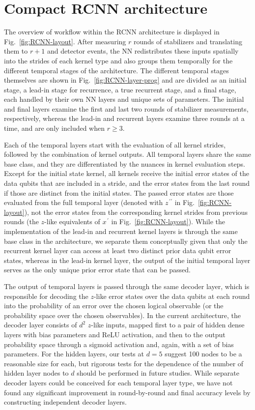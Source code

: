 \section{Compact RCNN architecture}
\label{sec:rcnn}

The overview of workflow within the RCNN architecture is displayed in Fig.~\ref{fig:RCNN-layout}. After measuring $r$ rounds of stabilizers and translating them to $r+1$  and  detector events, the NN redistributes these inputs spatially into the strides of each kernel type and also groups them temporally for the different temporal stages of the architecture. The different temporal stages themselves are shown in Fig.~\ref{fig:RCNN-layer-prog} and are divided as an initial stage, a lead-in stage for recurrence, a true recurrent stage, and a final stage, each handled by their own NN layers and unique sets of parameters. The initial and final layers examine the first and last two rounds of stabilizer measurements, respectively, whereas the lead-in and recurrent layers examine three rounds at a time, and are only included when $r\geq3$.

Each of the temporal layers start with the evaluation of all kernel strides, followed by the combination of kernel outputs. All temporal layers share the same base class, and they are differentiated by the nuances in kernel evaluation steps. Except for the initial state kernel, all kernels receive the initial error states of the data qubits that are included in a stride, and the error states from the last round if those are distinct from the initial states. The passed error states are those evaluated from the full temporal layer (denoted with $z^{\,\prime\prime}$ in Fig.~\ref{fig:RCNN-layout}), not the error states from the corresponding kernel strides from previous rounds (the $z$-like equivalents of $x^{\,\prime}$ in Fig.~\ref{fig:RCNN-layout}). While the implementation of the lead-in and recurrent kernel layers is through the same base class in the architecture, we separate them conceptually given that only the recurrent kernel layer can access at least two distinct prior data qubit error states, whereas in the lead-in kernel layer, the output of the initial temporal layer serves as the only unique prior error state that can be passed.

The output of temporal layers is passed through the same decoder layer, which is responsible for decoding the $z$-like error states over the data qubits at each round into the probability of an error over the chosen logical observable (or the probability space over the chosen observables). 
In the current architecture, the decoder layer consists of $d^2$ $z$-like inputs, mapped first to a pair of hidden dense layers with bias parameters and ReLU activation, and then to the output probability space through a sigmoid activation and, again, with a set of bias parameters. For the hidden layers, our tests at $d=5$ suggest 100 nodes to be a reasonable size for each, but rigorous tests for the dependence of the number of hidden layer nodes to $d$ should be performed in future studies. While separate decoder layers could be conceived for each temporal layer type, we have not found any significant improvement in round-by-round and final accuracy levels by constructing independent decoder layers.

